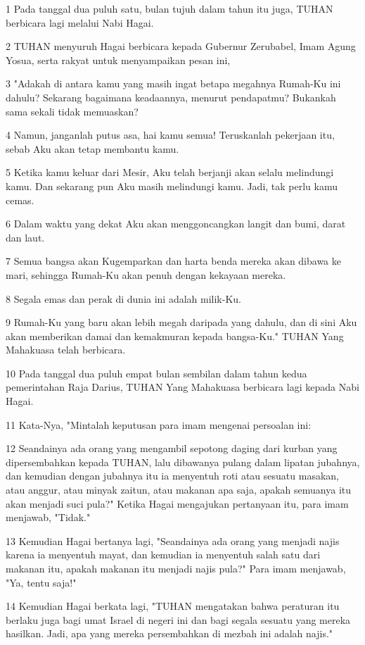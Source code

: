 \par 1 Pada tanggal dua puluh satu, bulan tujuh dalam tahun itu juga, TUHAN berbicara lagi melalui Nabi Hagai.
\par 2 TUHAN menyuruh Hagai berbicara kepada Gubernur Zerubabel, Imam Agung Yosua, serta rakyat untuk menyampaikan pesan ini,
\par 3 "Adakah di antara kamu yang masih ingat betapa megahnya Rumah-Ku ini dahulu? Sekarang bagaimana keadaannya, menurut pendapatmu? Bukankah sama sekali tidak memuaskan?
\par 4 Namun, janganlah putus asa, hai kamu semua! Teruskanlah pekerjaan itu, sebab Aku akan tetap membantu kamu.
\par 5 Ketika kamu keluar dari Mesir, Aku telah berjanji akan selalu melindungi kamu. Dan sekarang pun Aku masih melindungi kamu. Jadi, tak perlu kamu cemas.
\par 6 Dalam waktu yang dekat Aku akan menggoncangkan langit dan bumi, darat dan laut.
\par 7 Semua bangsa akan Kugemparkan dan harta benda mereka akan dibawa ke mari, sehingga Rumah-Ku akan penuh dengan kekayaan mereka.
\par 8 Segala emas dan perak di dunia ini adalah milik-Ku.
\par 9 Rumah-Ku yang baru akan lebih megah daripada yang dahulu, dan di sini Aku akan memberikan damai dan kemakmuran kepada bangsa-Ku." TUHAN Yang Mahakuasa telah berbicara.
\par 10 Pada tanggal dua puluh empat bulan sembilan dalam tahun kedua pemerintahan Raja Darius, TUHAN Yang Mahakuasa berbicara lagi kepada Nabi Hagai.
\par 11 Kata-Nya, "Mintalah keputusan para imam mengenai persoalan ini:
\par 12 Seandainya ada orang yang mengambil sepotong daging dari kurban yang dipersembahkan kepada TUHAN, lalu dibawanya pulang dalam lipatan jubahnya, dan kemudian dengan jubahnya itu ia menyentuh roti atau sesuatu masakan, atau anggur, atau minyak zaitun, atau makanan apa saja, apakah semuanya itu akan menjadi suci pula?" Ketika Hagai mengajukan pertanyaan itu, para imam menjawab, "Tidak."
\par 13 Kemudian Hagai bertanya lagi, "Seandainya ada orang yang menjadi najis karena ia menyentuh mayat, dan kemudian ia menyentuh salah satu dari makanan itu, apakah makanan itu menjadi najis pula?" Para imam menjawab, "Ya, tentu saja!"
\par 14 Kemudian Hagai berkata lagi, "TUHAN mengatakan bahwa peraturan itu berlaku juga bagi umat Israel di negeri ini dan bagi segala sesuatu yang mereka hasilkan. Jadi, apa yang mereka persembahkan di mezbah ini adalah najis."
